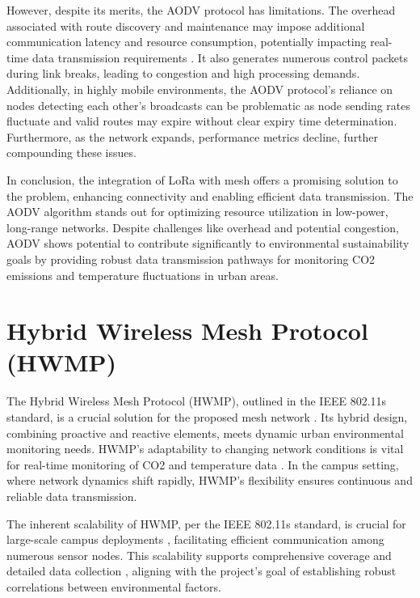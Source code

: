 However, despite its merits, the AODV protocol has limitations. The overhead associated with route discovery and maintenance may impose additional communication latency and resource consumption, potentially impacting real-time data transmission requirements \cite{Bhardwaj_2020}. It also generates numerous control packets during link breaks, leading to congestion and high processing demands. Additionally, in highly mobile environments, the AODV protocol's reliance on nodes detecting each other's broadcasts can be problematic as node sending rates fluctuate and valid routes may expire without clear expiry time determination. Furthermore, as the network expands, performance metrics decline, further compounding these issues.

In conclusion, the integration of LoRa with mesh offers a promising solution to the problem, enhancing connectivity and enabling efficient data transmission. The AODV algorithm stands out for optimizing resource utilization in low-power, long-range networks. Despite challenges like overhead and potential congestion, AODV shows potential to contribute significantly to environmental sustainability goals by providing robust data transmission pathways for monitoring CO2 emissions and temperature fluctuations in urban areas.

\section{Hybrid Wireless Mesh Protocol (HWMP)}\label{sec:lr_hwmp}

The Hybrid Wireless Mesh Protocol (HWMP), outlined in the IEEE 802.11s standard, is a crucial solution for the proposed mesh network \cite{Yang_Ma_Miao_2009}. Its hybrid design, combining proactive and reactive elements, meets dynamic urban environmental monitoring needs. HWMP's adaptability to changing network conditions is vital for real-time monitoring of CO2 and temperature data \cite{4428721}. In the campus setting, where network dynamics shift rapidly, HWMP's flexibility ensures continuous and reliable data transmission. 

The inherent scalability of HWMP, per the IEEE 802.11s standard, is crucial for large-scale campus deployments \cite{5409759}, facilitating efficient communication among numerous sensor nodes. This scalability supports comprehensive coverage and detailed data collection \cite{SFH2012}, aligning with the project's goal of establishing robust correlations between environmental factors. 

